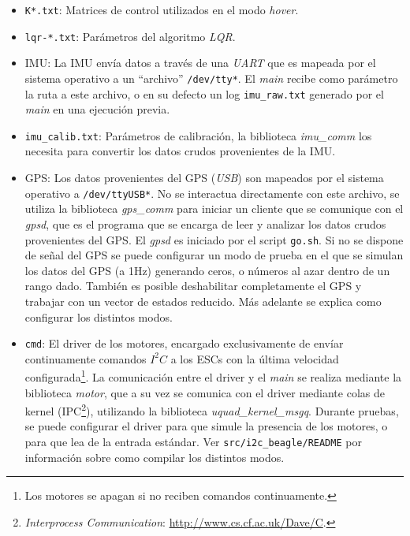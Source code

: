 \documentclass[main]{subfiles}
\begin{document}
\begin{itemize}
\item \verb+K*.txt+: Matrices de control utilizados en el modo \textit{hover}.
\item \verb+lqr-*.txt+: Par\'ametros del algoritmo \textit{LQR}.
\item IMU: La IMU env\'ia datos a trav\'es de una \textit{UART} que es mapeada por el sistema operativo a un ``archivo'' \verb+/dev/tty*+. El \textit{main} recibe como par\'ametro la ruta a este archivo, o en su defecto un log \verb+imu_raw.txt+ generado por el \textit{main} en una ejecuci\'on previa.
\item \verb+imu_calib.txt+: Par\'ametros de calibraci\'on, la biblioteca \textit{imu\_comm} los necesita para convertir los datos crudos provenientes de la IMU.
\item GPS: Los datos provenientes del GPS  (\textit{USB}) son mapeados por el sistema operativo a \verb+/dev/ttyUSB*+. No se interactua directamente con este archivo, se utiliza la biblioteca \textit{gps\_comm} para iniciar un cliente que se comunique con el \textit{gpsd}, que es el programa que se encarga de leer y analizar los datos crudos provenientes del GPS. El \textit{gpsd} es iniciado por el script \verb+go.sh+.\newline
Si no se dispone de se\~nal del GPS se puede configurar un modo de prueba en el que se simulan los datos del GPS (a 1Hz) generando ceros, o números al azar dentro de un rango dado. Tambi\'en es posible deshabilitar completamente el GPS y trabajar con un vector de estados reducido. M\'as adelante se explica como configurar los distintos modos.
\item \verb+cmd+: El driver de los motores, encargado exclusivamente de env\'iar continuamente comandos $I^2C$ a los ESCs con la \'ultima velocidad configurada\footnote{Los motores se apagan si no reciben comandos continuamente.}. La comunicaci\'on entre el driver y el \textit{main} se realiza mediante la biblioteca \textit{motor}, que a su vez se comunica con el driver mediante colas de kernel (IPC\footnote{\textit{Interprocess Communication}: \url{http://www.cs.cf.ac.uk/Dave/C}.}), utilizando la biblioteca \textit{uquad\_kernel\_msgq}.\newline
Durante pruebas, se puede configurar el driver para que simule la presencia de los motores, o para que lea de la entrada est\'andar. Ver \verb+src/i2c_beagle/README+ por informaci\'on sobre como compilar los distintos modos.
\end{itemize}
\end{document}
